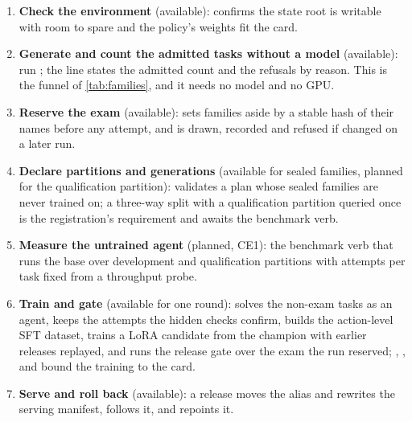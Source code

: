 \begin{enumerate}
\item \textbf{Check the environment} (available):  confirms the state
root is writable with room to spare and the policy's weights fit the card.
\item \textbf{Generate and count the admitted tasks without a model} (available): run
; the \code{[tasks]} line states the admitted count
and the refusals by reason. This is the funnel of \cref{tab:families}, and it needs no model and
no GPU.
\item \textbf{Reserve the exam} (available):  sets families aside by a
stable hash of their names before any attempt, and  is drawn, recorded and
refused if changed on a later run.
\item \textbf{Declare partitions and generations} (available for sealed families, planned for
the qualification partition):  validates a plan whose sealed
families are never trained on; a three-way split with a qualification partition queried once
is the registration's requirement and awaits the benchmark verb.
\item \textbf{Measure the untrained agent} (planned, CE1): the benchmark verb that runs the base
over development and qualification partitions with attempts per task fixed from a throughput
probe.
\item \textbf{Train and gate} (available for one round):  solves the
non-exam tasks as an agent, keeps the attempts the hidden checks confirm, builds the
action-level SFT dataset, trains a LoRA candidate from the champion with earlier releases
replayed, and runs the release gate over the exam the run reserved; ,
,  and  bound the training to the card.
\item \textbf{Serve and roll back} (available): a release moves the alias and rewrites the
serving manifest,  follows it, and 
repoints it.
\end{enumerate}

\begin{table}[t]
\centering\small

\caption{The eight authored repository families: language, tests, and tasks admitted by the
fault-seeding funnel (values read from the family catalogue at the pinned revision and
checked by the ledger).}\label{tab:families}
\end{table}

